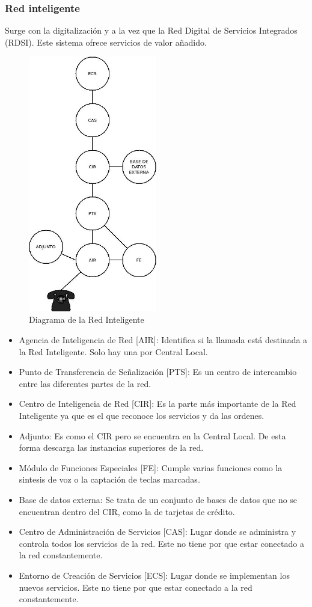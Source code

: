 \subsubsection{Red inteligente}
Surge con la digitalización y a la vez que la Red Digital de Servicios Integrados (RDSI). Este sistema ofrece servicios de valor añadido.
\begin{figure}[H]
\centering
\includegraphics[width=0.5\textwidth]{Imagen/diaredinteligente.jpg}
\caption{Diagrama de la Red Inteligente}
\end{figure}
\begin{itemize}
\item Agencia de Inteligencia de Red [AIR]: Identifica si la llamada está destinada a la Red Inteligente. Solo hay una por Central Local.
\item Punto de Transferencia de Señalización [PTS]: Es un centro de intercambio entre las diferentes partes de la red.
\item Centro de Inteligencia de Red [CIR]: Es la parte más importante de la Red Inteligente ya que es el que reconoce los servicios y da las ordenes.
\item Adjunto: Es como el CIR pero se encuentra en la Central Local. De esta forma descarga las instancias superiores de la red.
\item Módulo de Funciones Especiales [FE]: Cumple varias funciones como la sintesis de voz o la captación de teclas marcadas.
\item Base de datos externa: Se trata de un conjunto de bases de datos que no se encuentran dentro del CIR, como la de tarjetas de crédito.
\item Centro de Administración de Servicios [CAS]: Lugar donde se administra y controla todos los servicios de la red. Este no tiene por que estar conectado a la red constantemente.
\item Entorno de Creación de Servicios [ECS]: Lugar donde se implementan los nuevos servicios. Este no tiene por que estar conectado a la red constantemente.
\end{itemize}
